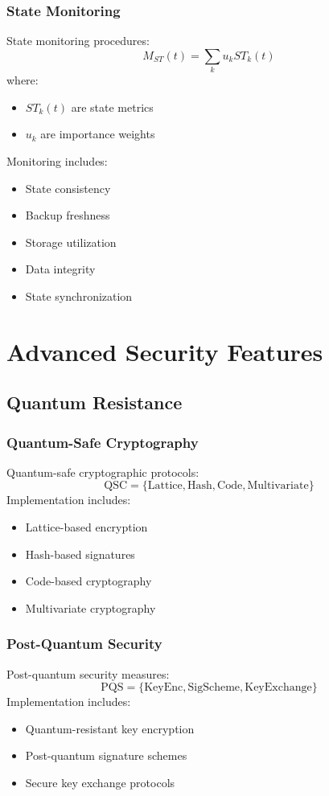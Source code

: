\documentclass[12pt]{article}
\begin{document}
\subsubsection{State Monitoring}
State monitoring procedures:
\begin{equation}
M_{ST}(t) = \sum_k u_k ST_k(t)
\end{equation}
where:
\begin{itemize}
\item $ST_k(t)$ are state metrics
\item $u_k$ are importance weights
\end{itemize}
Monitoring includes:
\begin{itemize}
\item State consistency
\item Backup freshness
\item Storage utilization
\item Data integrity
\item State synchronization
\end{itemize}
\section{Advanced Security Features}
\subsection{Quantum Resistance}
\subsubsection{Quantum-Safe Cryptography}
Quantum-safe cryptographic protocols:
\begin{equation}
\text{QSC} = \{\text{Lattice}, \text{Hash}, \text{Code}, \text{Multivariate}\}
\end{equation}
Implementation includes:
\begin{itemize}
\item Lattice-based encryption
\item Hash-based signatures
\item Code-based cryptography
\item Multivariate cryptography
\end{itemize}
\subsubsection{Post-Quantum Security}
Post-quantum security measures:
\begin{equation}
\text{PQS} = \{\text{KeyEnc}, \text{SigScheme}, \text{KeyExchange}\}
\end{equation}
Implementation includes:
\begin{itemize}
\item Quantum-resistant key encryption
\item Post-quantum signature schemes
\item Secure key exchange protocols
\end{itemize}
\end{document}
